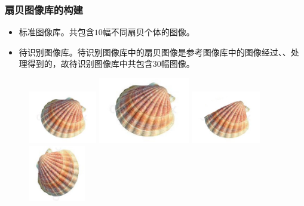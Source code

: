 \documentclass[notheorems,mathserif,table,compress]{beamer}  %
\begin{document}
\begin{frame}
\frametitle{扇贝图像库的构建}
\begin{itemize}
\item 标准图像库。共包含$10$幅不同扇贝个体的图像。
\item 待识别图像库。待识别图像库中的扇贝图像是参考图像库中的图像经过{\color{red}{旋转}}、{\color{red}{缩放}}、{\color{red}{遮挡}}处理得到的，故待识别图像库中共包含$30$幅图像。
\end{itemize}
\begin{figure}
\centering
  \begin{minipage}[b]{0.33\textwidth} 
      \centering 
      \includegraphics[width=3cm]{chap04/28-ori}
    \end{minipage}
  \begin{minipage}[b]{0.33\textwidth}
    \centering
    \includegraphics[width=4cm]{chap04/28-da}
    \end{minipage}
  \begin{minipage}[b]{0.33\textwidth} 
      \centering 
      \includegraphics[width=3cm]{chap04/28-qu}
    \end{minipage}
  \begin{minipage}[b]{0.33\textwidth}
    \centering
    \includegraphics[width=2.5cm]{chap04/28-zhuan}
  \end{minipage}
\caption*{\color{blue}{扇贝参考图像与待识别图像}}
\end{figure}
\end{frame}
\end{document}

